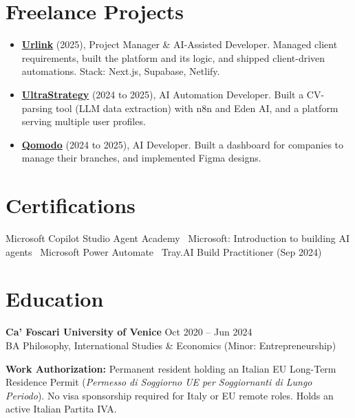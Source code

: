 \documentclass[a4paper,10pt]{article}
\begin{document}
\section{Freelance Projects}
\begin{itemize}
 \item \textbf{\href{https://smarturlink.com/}{Urlink}} (2025), Project Manager \& AI-Assisted Developer. Managed client requirements, built the platform and its logic, and shipped client-driven automations. Stack: Next.js, Supabase, Netlify.
 \item \textbf{\href{https://ultrastrategy.com}{UltraStrategy}} (2024 to 2025), AI Automation Developer. Built a CV-parsing tool (LLM data extraction) with n8n and Eden AI, and a platform serving multiple user profiles.
 \item \textbf{\href{https://www.qomodo.me/}{Qomodo}} (2024 to 2025), AI Developer. Built a dashboard for companies to manage their branches, and implemented Figma designs.
\end{itemize}

\section{Certifications}
Microsoft Copilot Studio Agent Academy \textbullet\ Microsoft: Introduction to building AI agents \textbullet\ Microsoft Power Automate \textbullet\ Tray.AI Build Practitioner (Sep 2024)

\section{Education}
\textbf{Ca' Foscari University of Venice} \hfill Oct 2020 -- Jun 2024\\
BA Philosophy, International Studies \& Economics (Minor: Entrepreneurship)

\vspace{2pt}
{\footnotesize \textbf{Work Authorization:} Permanent resident holding an Italian EU Long-Term Residence Permit (\textit{Permesso di Soggiorno UE per Soggiornanti di Lungo Periodo}). No visa sponsorship required for Italy or EU remote roles. Holds an active Italian Partita IVA.}
\end{document}
